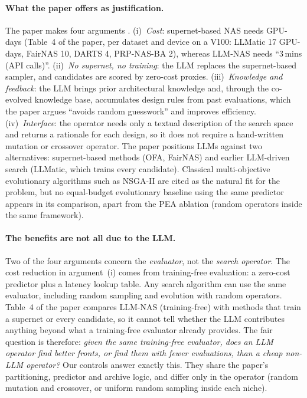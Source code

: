 \documentclass[11pt,a4paper]{article}
\begin{document}
\paragraph{What the paper offers as justification.} The paper makes four arguments \cite{llmnas}. (i)~\emph{Cost}: supernet-based NAS needs GPU-days (Table~4 of the paper, per dataset and device on a V100: LLMatic 17 GPU-days, FairNAS 10, DARTS 4, PRP-NAS-BA 2), whereas LLM-NAS needs ``3\,mins (API calls)''. (ii)~\emph{No supernet, no training}: the LLM replaces the supernet-based sampler, and candidates are scored by zero-cost proxies. (iii)~\emph{Knowledge and feedback}: the LLM brings prior architectural knowledge and, through the co-evolved knowledge base, accumulates design rules from past evaluations, which the paper argues ``avoids random guesswork'' and improves efficiency. (iv)~\emph{Interface}: the operator needs only a textual description of the search space and returns a rationale for each design, so it does not require a hand-written mutation or crossover operator. The paper positions LLMs against two alternatives: supernet-based methods (OFA, FairNAS) and earlier LLM-driven search (LLMatic, which trains every candidate). Classical multi-objective evolutionary algorithms such as NSGA-II are cited as the natural fit for the problem, but no equal-budget evolutionary baseline using the same predictor appears in its comparison, apart from the PEA ablation (random operators inside the same framework).

\paragraph{The benefits are not all due to the LLM.} Two of the four arguments concern the \emph{evaluator}, not the \emph{search operator}. The cost reduction in argument~(i) comes from training-free evaluation: a zero-cost predictor plus a latency lookup table. Any search algorithm can use the same evaluator, including random sampling and evolution with random operators. Table~4 of the paper compares LLM-NAS (training-free) with methods that train a supernet or every candidate, so it cannot tell whether the LLM contributes anything beyond what a training-free evaluator already provides. The fair question is therefore: \emph{given the same training-free evaluator, does an LLM operator find better fronts, or find them with fewer evaluations, than a cheap non-LLM operator?} Our controls answer exactly this. They share the paper's partitioning, predictor and archive logic, and differ only in the operator (random mutation and crossover, or uniform random sampling inside each niche).
\end{document}

